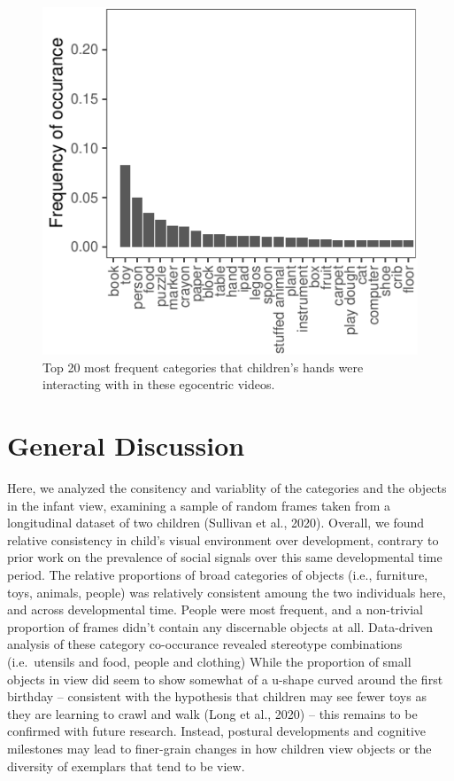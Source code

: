 \documentclass[10pt, letterpaper]{article}
\newenvironment{CodeChunk}{}{}
\begin{document}
\begin{CodeChunk}
\begin{figure}[h]

{\centering \includegraphics{figs/freq_interact-1} 

}

\caption[Top 20 most frequent categories that children's hands were interacting with in these egocentric videos]{Top 20 most frequent categories that children's hands were interacting with in these egocentric videos.}\label{fig:freq_interact}
\end{figure}
\end{CodeChunk}

\hypertarget{general-discussion}{%
\section{General Discussion}\label{general-discussion}}

Here, we analyzed the consitency and variablity of the categories and
the objects in the infant view, examining a sample of random frames
taken from a longitudinal dataset of two children (Sullivan et al.,
2020). Overall, we found relative consistency in child's visual
environment over development, contrary to prior work on the prevalence
of social signals over this same developmental time period. The relative
proportions of broad categories of objects (i.e., furniture, toys,
animals, people) was relatively consistent amoung the two individuals
here, and across developmental time. People were most frequent, and a
non-trivial proportion of frames didn't contain any discernable objects
at all. Data-driven analysis of these category co-occurance revealed
stereotype combinations (i.e.~utensils and food, people and clothing)
While the proportion of small objects in view did seem to show somewhat
of a u-shape curved around the first birthday -- consistent with the
hypothesis that children may see fewer toys as they are learning to
crawl and walk (Long et al., 2020) -- this remains to be confirmed with
future research. Instead, postural developments and cognitive milestones
may lead to finer-grain changes in how children view objects or the
diversity of exemplars that tend to be view.
\end{document}
